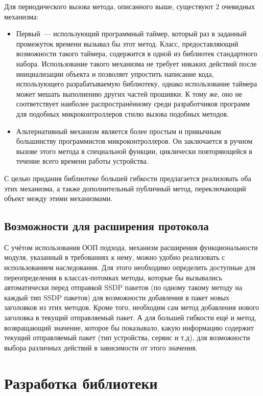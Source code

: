 Для периодического вызова метода, описанного выше, существуют 2 очевидных механизма:

\begin{itemize}
	\item Первый~--- использующий программный таймер, который раз в заданный промежуток времени вызывал бы этот метод.
	Класс, предоставляющий возможности такого таймера, содержится в одной из библиотек стандартного набора.
	Использование такого механизма не требует никаких действий после инициализации объекта и позволяет упростить написание кода, использующего разрабатываемую библиотеку, однако использование таймера может мешать выполнению других частей прошивки.
	К тому же, оно не соответствует наиболее распространённому среди разработчиков программ для подобных микроконтроллеров стилю вызова подобных методов.
	\item Альтернативный механизм является более простым и привычным большинству программистов микроконтроллеров.
Он заключается в ручном вызове этого метода в специальной функции, циклически повторяющейся в течение всего времени работы устройства.
\end{itemize}

С целью придания библиотеке большей гибкости предлагается реализовать оба этих механизма, а также дополнительный публичный метод, переключающий объект между этими механизмами.

\subsection{Возможности для расширения протокола} \label{subsection:ssdp-ext}

С учётом использования ООП подхода, механизм расширения функциональности модуля, указанный в требованиях к нему, можно удобно реализовать с использованием наследования.
Для этого необходимо определить доступные для переопределения в классах-потомках методы, которые бы вызывались автоматически перед отправкой SSDP пакетов (по одному такому методу на каждый тип SSDP пакетов) для возможности добавления в пакет новых заголовков из этих методов.
Кроме того, необходим сам метод добавления нового заголовка в текущий отправляемый пакет.
А для большей гибкости ещё и метод, возвращающий значение, которое бы показывало, какую информацию содержит текущий отправляемый пакет (тип устройства, сервис и т.д), для возможности выбора различных действий в зависимости от этого значения.


\section{Разработка библиотеки}

